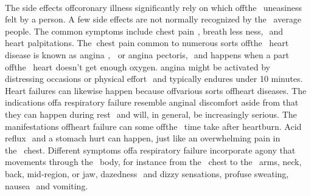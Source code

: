 \documentclass[oneside,12pt]{Classes/VTU}
\begin{document}
    \paragraph{}
    The side effects of\tiny\textcolor{white}{f}\normalsize coronary illness significantly rely on which of\tiny\textcolor{white}{f}\normalsize the\tiny\textcolor{white}{m}\normalsize uneasiness felt by a person. A few side effects are not normally recognized by the\tiny\textcolor{white}{m}\normalsize average people. The common symptoms include\tiny\textcolor{white}{s}\normalsize chest\tiny\textcolor{white}{s}\normalsize pain\tiny\textcolor{white}{s}\normalsize, breath less ness, \tiny\textcolor{white}{s}\normalsize and heart\tiny\textcolor{white}{s}\normalsize palpitations. The\tiny\textcolor{white}{n}\normalsize chest\tiny\textcolor{white}{s}\normalsize pain common to numerous sorts of\tiny\textcolor{white}{f}\normalsize the\tiny\textcolor{white}{m}\normalsize heart disease is known as\tiny\textcolor{white}{s}\normalsize angina\tiny\textcolor{white}{s}\normalsize, \tiny\textcolor{white}{n}\normalsize or angina\tiny\textcolor{white}{s}\normalsize pectoris, \tiny\textcolor{white}{s}\normalsize and happens when a part of\tiny\textcolor{white}{f}\normalsize the\tiny\textcolor{white}{m}\normalsize heart\tiny\textcolor{white}{s}\normalsize doesn't get\tiny\textcolor{white}{s}\normalsize enough oxygen. angina\tiny\textcolor{white}{s}\normalsize might be activated by distressing occasions or physical effort \tiny\textcolor{white}{s}\normalsize and typically endures under 10 minutes. Heart failures can likewise happen because of\tiny\textcolor{white}{f}\normalsize various sorts of\tiny\textcolor{white}{f}\normalsize heart diseases. The indications of\tiny\textcolor{white}{f}\normalsize a respiratory failure resemble anginal\tiny\textcolor{white}{s}\normalsize discomfort aside from that they can happen during rest \tiny\textcolor{white}{s}\normalsize and will, in general, be increasingly serious. The manifestations of\tiny\textcolor{white}{f}\normalsize heart failure can some of\tiny\textcolor{white}{f}\normalsize the\tiny\textcolor{white}{m}\normalsize time take after heartburn. Acid reflux \tiny\textcolor{white}{s}\normalsize and a stomach hurt can happen, just like an overwhelming pain in the\tiny\textcolor{white}{m}\normalsize chest. Different symptoms of\tiny\textcolor{white}{f}\normalsize a respiratory failure incorporate agony that movements through the\tiny\textcolor{white}{m}\normalsize body, for instance from the\tiny\textcolor{white}{m}\normalsize chest to the\tiny\textcolor{white}{m}\normalsize arms, neck, back, mid-region, or jaw, dazedness \tiny\textcolor{white}{s}\normalsize and dizzy sensations, profuse sweating, nausea \tiny\textcolor{white}{s}\normalsize and vomiting.
\end{document}
